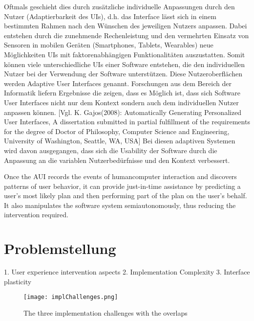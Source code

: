 Oftmals geschieht dies durch zusätzliche individuelle Anpassungen durch den Nutzer (Adaptierbarkeit des UIs),
d.h. das Interface lässt sich in einem bestimmten Rahmen nach den Wünschen des jeweiligen Nutzers anpassen.
Dabei entstehen durch die zunehmende Rechenleistung und den vermehrten Einsatz von Sensoren in mobilen Geräten
(Smartphones, Tablets, Wearables) neue Möglichkeiten UIs mit faktorenabhängigen Funktionalitäten auszustatten.
Somit können viele unterschiedliche UIs einer Software entstehen, die den individuellen Nutzer bei der Verwendung der Software unterstützen.
Diese Nutzeroberflächen werden Adaptive User Interfaces genannt. Forschungen aus dem Bereich der Informatik liefern Ergebnisse die zeigen,
dass es Möglich ist, dass sich Software User Interfaces nicht nur dem Kontext sondern auch dem individuellen Nutzer anpassen können. [Vgl. K. Gajos(2008): Automatically Generating Personalized User Interfaces, A dissertation submitted in partial fulfillment of the requirements for the degree of Doctor of Philosophy, Computer Science and Engineering, University of Washington, Seattle, WA, USA]
Bei diesen adaptiven Systemen wird davon ausgegangen, dass sich die Usability der Software durch die Anpassung an die
variablen Nutzerbedürfnisse und den Kontext verbessert.

Once the AUI records the events of humancomputer interaction and discovers patterns of user behavior, it can provide just-in-time assistance by
predicting a user’s most likely plan and then performing part of the plan on the user’s behalf. It also manipulates the software system semiautonomously,
thus reducing the intervention required.

\section{Problemstellung}
1. User experience intervention aspects %
2. Implementation Complexity %
3. Interface plasticity %

\begin{figure}[h]
    \centering
    \texttt{[image: implChallenges.png]}
    \caption{The three implementation challenges with the overlaps}
\end{figure}

